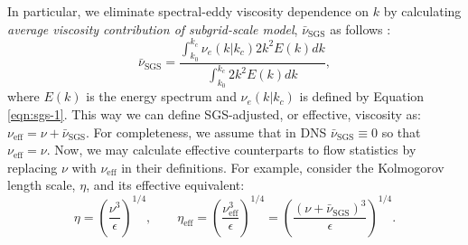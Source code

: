 \documentclass{pracamgren}
\begin{document}
In particular, we eliminate spectral-eddy viscosity dependence on $k$ by calculating \emph{average viscosity contribution of subgrid-scale model}, $\bar{\nu}_{\text{SGS}}$ as follows \parencite[Equation 13]{Jin2010}:
\begin{equation}
\bar{\nu}_{\text{SGS}} =
\frac
{\int_{k_0}^{k_c} \nu_{e}(k|k_c) 2 k^2 E(k) dk}
{\int_{k_0}^{k_c} 2 k^2 E(k) dk} ,
\label{egn:rnu-sgs}
\end{equation}
where $E(k)$ is the energy spectrum and $\nu_{e}(k|k_c)$ is defined by Equation \ref{eqn:sgs-1}.
This way we can define SGS-adjusted, or effective, viscosity as: $\nu_{\text{eff}} = \nu + \bar{\nu}_{\text{SGS}}$.
For completeness, we assume that in DNS $\bar{\nu}_{\text{SGS}} \equiv 0$ so that $\nu_{\text{eff}} = \nu$.
Now, we may calculate effective counterparts to flow statistics by replacing $\nu$ with $\nu_{\text{eff}}$ in their definitions.
For example, consider the Kolmogorov length scale, $\eta$, and its effective equivalent:
$$
\eta = \left( \frac{\nu^3}{\epsilon} \right)^{1/4} , \quad \quad \eta_{\text{eff}} = \left( \frac{\nu_{\text{eff}}^3}{\epsilon} \right)^{1/4} = \left( \frac{(\nu + \bar{\nu}_{\text{SGS}})^3}{\epsilon} \right)^{1/4} .
$$
\end{document}
